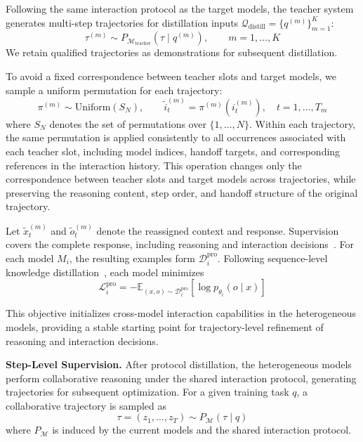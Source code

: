 \documentclass{article} %
\begin{document}
Following the same interaction protocol as the target models, the teacher system generates multi-step trajectories for distillation inputs
$\mathcal{Q}_{\mathrm{distill}}=\{q^{(m)}\}_{m=1}^{K}$:
\begin{equation}
    \tau^{(m)}
    \sim
    P_{\mathcal{M}_{\mathrm{teacher}}}
    \left(\tau \mid q^{(m)}\right),
    \qquad
    m=1,\ldots,K
\end{equation}
We retain qualified trajectories as demonstrations for subsequent distillation.

To avoid a fixed correspondence between teacher slots and target models, we sample a uniform permutation for each trajectory:
\begin{equation}
    \pi^{(m)}
    \sim
    \mathrm{Uniform}(S_N),
    \qquad
    \widetilde{i}_t^{(m)}
    =
    \pi^{(m)}
    \left(i_t^{(m)}\right),
    \quad
    t=1,\ldots,T_m
\end{equation}
where $S_N$ denotes the set of permutations over $\{1,\ldots,N\}$. Within each trajectory, the same permutation is applied consistently to all occurrences associated with each teacher slot, including model indices, handoff targets, and corresponding references in the interaction history. This operation changes only the correspondence between teacher slots and target models across trajectories, while preserving the reasoning content, step order, and handoff structure of the original trajectory.

Let $\widetilde{x}_t^{(m)}$ and $\widetilde{o}_t^{(m)}$ denote the reassigned context and response. Supervision covers the complete response, including reasoning and interaction decisions~\citep{chen2023fireact}. For each model $M_i$, the resulting examples form $\mathcal{D}_i^{\mathrm{pro}}$. Following sequence-level knowledge distillation~\citep{kim2016sequence}, each model minimizes
\begin{equation}
    \mathcal{L}_i^{\mathrm{pro}}
    =
    -\mathbb{E}_{(x,o)\sim\mathcal{D}_i^{\mathrm{pro}}}
    \left[
        \log p_{\theta_i}(o\mid x)
    \right]
\end{equation}

This objective initializes cross-model interaction capabilities in the heterogeneous models, providing a stable starting point for trajectory-level refinement of reasoning and interaction decisions.

\noindent\textbf{Step-Level Supervision.}\quad
After protocol distillation, the heterogeneous models perform collaborative reasoning under the shared interaction protocol, generating trajectories for subsequent optimization. For a given training task $q$, a collaborative trajectory is sampled as
\begin{equation}
    \tau
    =
    (z_1,\ldots,z_T)
    \sim
    P_{\mathcal{M}}(\tau\mid q)
\end{equation}
where $P_{\mathcal{M}}$ is induced by the current models and the shared interaction protocol.
\end{document}
